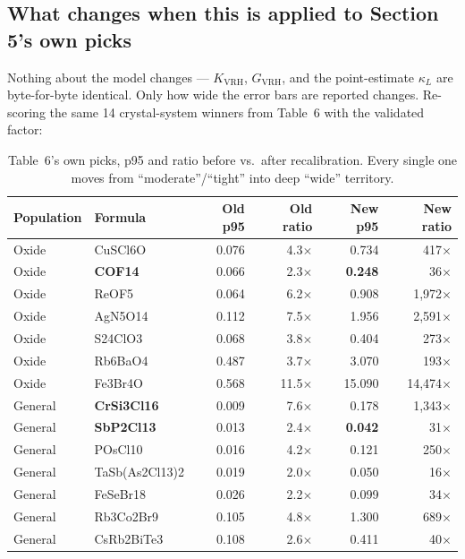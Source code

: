 \documentclass[11pt,a4paper]{article}
\newcommand{\GV}{$G_{\mathrm{VRH}}$}
\newcommand{\KL}{$\kappa_L$}
\begin{document}
\subsection{What changes when this is applied to Section 5's own picks}

Nothing about the model changes --- $K_{\mathrm{VRH}}$, \GV{}, and the
point-estimate \KL{} are byte-for-byte identical. Only how wide the error
bars are reported changes. Re-scoring the same 14 crystal-system winners
from Table~6 with the validated factor:

\begin{table}[H]
\centering
\footnotesize
\caption{Table~6's own picks, p95 and ratio before vs.\ after recalibration.
Every single one moves from ``moderate''/``tight'' into deep ``wide''
territory.}
\begin{tabular}{ll rr rr}
\toprule
Population & Formula & Old p95 & Old ratio & New p95 & New ratio \\
\midrule
Oxide   & CuSCl6O        & 0.076 & 4.3$\times$  & 0.734  & 417$\times$ \\
Oxide   & \textbf{COF14} & 0.066 & 2.3$\times$  & \textbf{0.248} & 36$\times$ \\
Oxide   & ReOF5          & 0.064 & 6.2$\times$  & 0.908  & 1{,}972$\times$ \\
Oxide   & AgN5O14        & 0.112 & 7.5$\times$  & 1.956  & 2{,}591$\times$ \\
Oxide   & S24ClO3        & 0.068 & 3.8$\times$  & 0.404  & 273$\times$ \\
Oxide   & Rb6BaO4        & 0.487 & 3.7$\times$  & 3.070  & 193$\times$ \\
Oxide   & Fe3Br4O        & 0.568 & 11.5$\times$ & 15.090 & 14{,}474$\times$ \\
\midrule
General & \textbf{CrSi3Cl16} & 0.009 & 7.6$\times$ & 0.178 & 1{,}343$\times$ \\
General & \textbf{SbP2Cl13}  & 0.013 & 2.4$\times$ & \textbf{0.042} & 31$\times$ \\
General & POsCl10        & 0.016 & 4.2$\times$  & 0.121  & 250$\times$ \\
General & TaSb(As2Cl13)2 & 0.019 & 2.0$\times$  & 0.050  & 16$\times$ \\
General & FeSeBr18       & 0.026 & 2.2$\times$  & 0.099  & 34$\times$ \\
General & Rb3Co2Br9      & 0.105 & 4.8$\times$  & 1.300  & 689$\times$ \\
General & CsRb2BiTe3     & 0.108 & 2.6$\times$  & 0.411  & 40$\times$ \\
\bottomrule
\end{tabular}
\end{table}
\end{document}
